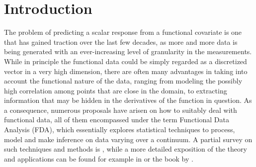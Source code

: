 %
%

\chapter{Introduction}


The problem of predicting a scalar response from a functional covariate is one that has gained traction over the last few decades, as more and more data is being generated with an ever-increasing level of granularity in the measurements. While in principle the functional data could be simply regarded as a discretized vector in a very high dimension, there are often many advantages in taking into account the functional nature of the data, ranging from modeling the possibly high correlation among points that are close in the domain, to extracting information that may be hidden in the derivatives of the function in question. As a consequence, numerous proposals have arisen on how to suitably deal with functional data, all of them encompassed under the term Functional Data Analysis (FDA), which essentially explores statistical techniques to process, model and make inference on data varying over a continuum. A partial survey on such techniques and methods is \citet{cuevas2014partial}, while a more detailed exposition of the theory and applications can be found for example in \citet{hsing2015theoretical} or the book by \citet{horvath2012inference}.

